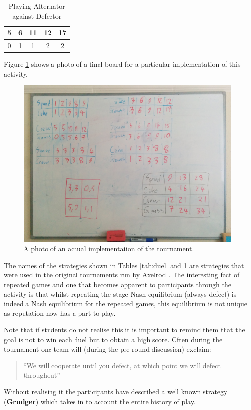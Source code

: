 \documentclass[12pt]{article}
\begin{document}
\begin{table}[!htbp]
    \caption{Playing Alternator against Defector}
    \centering
    \begin{tabular}{ccccc}
        \toprule
        5&6&11&12&17\\
        \midrule
        0&1&1&2&2\\
        \bottomrule
    \end{tabular}
    \label{tab:duel_1}
\end{table}

Figure \ref{fig:white_board} shows a photo of a final board for a particular
implementation of this activity.

\begin{figure}[!hbtp]
    \centering
    \includegraphics[width=.5\textwidth]{static/white_board.jpg}
    \caption{A photo of an actual implementation of the tournament.}
    \label{fig:white_board}
\end{figure}

The names of the strategies shown in Tables \ref{tab:duel} and \ref{tab:duel_1}
are strategies that were used in the original tournaments run by Axelrod
\cite{Axelrod1980a, Axelrod1980b}. The interesting fact of repeated games and
one that becomes apparent to participants through the activity is that whilst
repeating the stage Nash equilibrium (always defect) is indeed a Nash
equilibrium for the repeated games, this equilibrium is not unique as
reputation now has a part to play.

Note that if students do not realise this it is important to remind them that
the goal is not to win each duel but to obtain a high score. Often during the
tournament one team will (during the pre round discussion) exclaim:

\begin{quote}
   ``We will cooperate until you defect, at which point we will defect
throughout''
\end{quote}

Without realising it the participants have described a well known strategy
(\textbf{Grudger}) which takes in to account the entire history of play.
\end{document}
